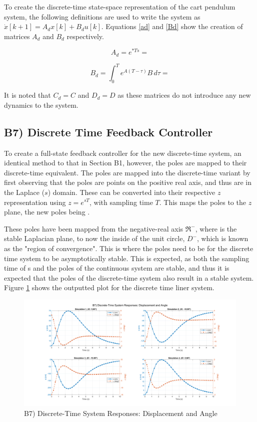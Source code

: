 \documentclass{article}
\begin{document}
To create the discrete-time state-space representation of the cart pendulum system, the following definitions are used to write the system as $\dot x[k+1]=A_dx[k]+B_du[k]$. Equations \ref{ad} and \ref{Bd} show the creation of matrices $A_d$ and $B_d$ respectively.

\begin{equation}\label{ad}
    A_d=e^{*Ts}=
\end{equation}


\begin{equation}\label{Bd}
    B_d=\int_{0}^{T} e^{A(T - \tau)} B \, d\tau=
\end{equation}

It is noted that $C_d=C$ and $D_d=D$ as these matrices do not introduce any new dynamics to the system.



\subsection*{B7) Discrete Time Feedback Controller}
To create a full-state feedback controller for the new discrete-time system, an identical method to that in Section B1, however, the poles are mapped to their discrete-time equivalent. The poles are mapped into the discrete-time variant by first observing that the poles are points on the positive real axis, and thus are in the Laplace ($s$) domain. These can be converted into their respective $z$ representation using $z=e^{sT}$, with sampling time $T$. This maps the poles to the $z$ plane, the new poles being . 
\newline

These poles have been mapped from the negative-real axis $\Re^-$, where is the stable Laplacian plane, to now the inside of the unit circle, $D^-$, which is known as the "region of convergence". This is where the poles need to be for the discrete time system to be asymptotically stable. This is expected, as both the sampling time of s and the poles of the continuous system are stable, and thus it is expected that the poles of the discrete-time system also result in a stable system. Figure \ref{B7} shows the outputted plot for the discrete time liner system.

\begin{figure}[H]
    \centering
    \includegraphics[width=\textwidth]{figures/B7_x.png}
    \caption{B7) Discrete-Time System Responses: Displacement and Angle}
    \label{B7}
\end{figure}
\end{document}
